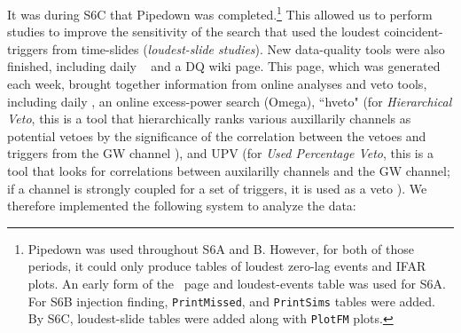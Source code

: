 It was during S6C that Pipedown was completed.\footnote{Pipedown was used
throughout S6A and B. However, for both of those periods, it could only produce
tables of loudest zero-lag events and IFAR plots. An early form of the
\ihope~page and loudest-events table was used for S6A. For S6B injection
finding, \texttt{PrintMissed}, and \texttt{PrintSims} tables were added. By
S6C, loudest-slide tables were added along with \texttt{PlotFM} plots.} This
allowed us to perform studies to improve the sensitivity of the search that
used the loudest coincident-triggers from time-slides (\emph{loudest-slide
studies}). New data-quality tools were also finished, including daily
\ihope~\cite{Pekowsky:thesis} and a DQ wiki page. This page, which was
generated each week, brought together information from online analyses and veto
tools, including daily \ihope, an online excess-power search (Omega), ``hveto"
(for \emph{Hierarchical Veto}, this is a tool that hierarchically ranks various
auxillarily channels as potential vetoes by the significance of the correlation
between the vetoes and triggers from the \ac{GW} channel \cite{Smith:hveto}),
and UPV (for \emph{Used Percentage Veto}, this is a tool that looks for
correlations between auxilarilly channels and the \ac{GW} channel; if a channel
is strongly coupled for a set of triggers, it is used as a veto
\cite{Isogai:UPV}). We therefore implemented the following system to analyze
the data:
